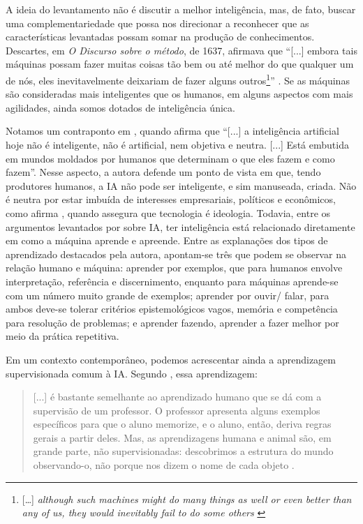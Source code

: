 \documentclass[portuguese]{textolivre}
\begin{document}
A ideia do levantamento não é discutir a melhor inteligência, mas, de fato, buscar uma complementariedade que possa nos direcionar a reconhecer que as características levantadas possam somar na produção de conhecimentos. Descartes, em \emph{O Discurso sobre o método}, de 1637, afirmava que “[...] embora tais máquinas possam fazer muitas coisas tão bem ou até melhor do que qualquer um de nós, eles inevitavelmente deixariam de fazer alguns outros\footnote{[…] \emph{although such machines might do many things as well or even better than any of us, they would inevitably fail to do some others} \cite[p. 57]{mclean2006}}” \cite[p. 57, tradução nossa]{mclean2006}. Se as máquinas são consideradas mais inteligentes que os humanos, em alguns aspectos com mais agilidades, ainda somos dotados de inteligência única.

Notamos um contraponto em \textcite[p. 249-250]{2022kaufman}, quando afirma que “[...] a inteligência artificial hoje não é inteligente, não é artificial, nem objetiva e neutra. [...] Está embutida em mundos moldados por humanos que determinam o que eles fazem e como fazem”. Nesse aspecto, a autora defende um ponto de vista em que, tendo produtores humanos, a IA não pode ser inteligente, e sim manuseada, criada. Não é neutra por estar imbuída de interesses empresariais, políticos e econômicos, como afirma \textcite{feenberg2004}, quando assegura que tecnologia é ideologia. Todavia, entre os argumentos levantados por \textcite{santaella2023inteligencia} sobre IA, ter inteligência está relacionado diretamente em como a máquina aprende e apreende. Entre as explanações dos tipos de aprendizado destacados pela autora, apontam-se três que podem se observar na relação humano e máquina: aprender por exemplos, que para humanos envolve interpretação, referência e discernimento, enquanto para máquinas aprende-se com um número muito grande de exemplos; aprender por ouvir/ falar, para ambos deve-se tolerar critérios epistemológicos vagos, memória e competência para resolução de problemas; e aprender fazendo, aprender a fazer melhor por meio da prática repetitiva.

Em um contexto contemporâneo, podemos acrescentar ainda a aprendizagem supervisionada comum à IA. Segundo \textcite[p. 180]{santaella2023inteligencia}, essa aprendizagem:

\begin{quote}
    [...] é bastante semelhante ao aprendizado humano que se dá com a supervisão de um professor. O professor apresenta alguns exemplos específicos para que o aluno memorize, e o aluno, então, deriva regras gerais a partir deles. Mas, as aprendizagens humana e animal são, em grande parte, não supervisionadas: descobrimos a estrutura do mundo observando-o, não porque nos dizem o nome de cada objeto \cite[p. 180]{santaella2023inteligencia}.
\end{quote}
\end{document}
